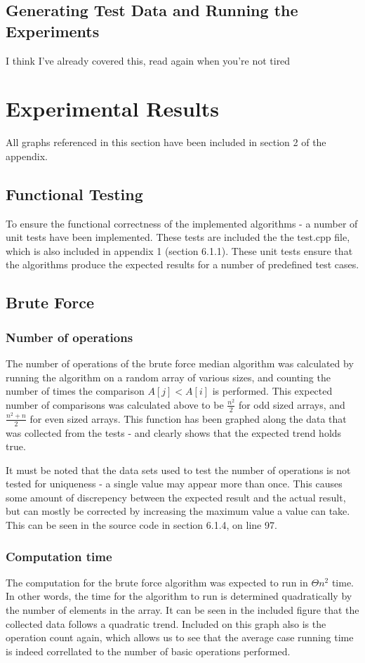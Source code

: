 \documentclass{article}
\begin{document}
    \subsection{Generating Test Data and Running the Experiments}
        I think I've already covered this, read again when you're not tired
 
\section{Experimental Results}
    All graphs referenced in this section have been included in section 2 of the appendix.
    \subsection{Functional Testing}
        To ensure the functional correctness of the implemented algorithms - a number of unit tests have been implemented. These tests are included the the test.cpp file, which is also included in appendix 1 (section 6.1.1). These unit tests ensure that the algorithms produce the expected results for a number of predefined test cases.
    \subsection{Brute Force}
        \subsubsection{Number of operations}
            The number of operations of the brute force median algorithm was calculated by running the algorithm on a random array of various sizes, and counting the number of times the comparison $A[j] < A[i]$ is performed. This expected number of comparisons was calculated above to be $\frac{n^2}{2}$ for odd sized arrays, and $\frac{n^2 + n}{2}$ for even sized arrays. This function has been graphed along the data that was collected from the tests - and clearly shows that the expected trend holds true.

            It must be noted that the data sets used to test the number of operations is not tested for uniqueness - a single value may appear more than once. This causes some amount of discrepency between the expected result and the actual result, but can mostly be corrected by increasing the maximum value a value can take. This can be seen in the source code in section 6.1.4, on line 97.
        \subsubsection{Computation time}
            The computation for the brute force algorithm was expected to run in $\Theta{n^2}$ time. In other words, the time for the algorithm to run is determined quadratically by the number of elements in the array. It can be seen in the included figure that the collected data follows a quadratic trend. Included on this graph also is the operation count again, which allows us to see that the average case running time is indeed correllated to the number of basic operations performed.
\end{document}

